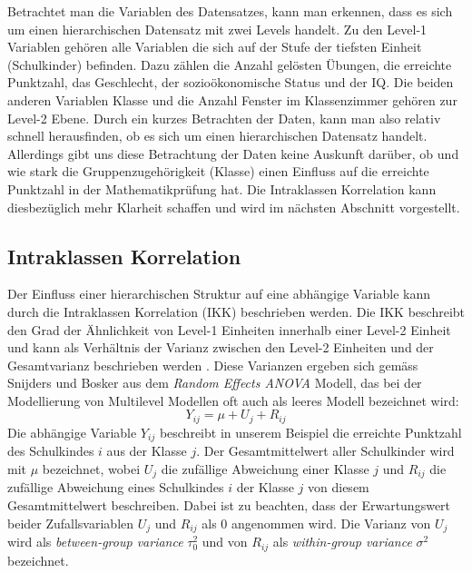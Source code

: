 \documentclass[12pt]{article}\usepackage[]{graphicx}\usepackage[]{color}
\begin{document}
Betrachtet man die Variablen des Datensatzes, kann man erkennen, dass es sich um einen hierarchischen Datensatz mit zwei Levels handelt. Zu den Level-1 Variablen gehören alle Variablen die sich auf der Stufe der tiefsten Einheit (Schulkinder) befinden. Dazu zählen die Anzahl gelösten Übungen, die erreichte Punktzahl, das Geschlecht, der sozioökonomische Status und der IQ. Die beiden anderen Variablen Klasse und die Anzahl Fenster im Klassenzimmer gehören zur Level-2 Ebene. Durch ein kurzes Betrachten der Daten, kann man also relativ schnell herausfinden, ob es sich um einen hierarchischen Datensatz handelt. Allerdings gibt uns diese Betrachtung der Daten keine Auskunft darüber, ob und wie stark die Gruppenzugehörigkeit (Klasse) einen Einfluss auf die erreichte Punktzahl in der Mathematikprüfung hat. Die Intraklassen Korrelation kann diesbezüglich mehr Klarheit schaffen und wird im nächsten Abschnitt vorgestellt.


\subsection{Intraklassen Korrelation} \label{section:icc}
Der Einfluss einer hierarchischen Struktur auf eine abhängige Variable kann durch die Intraklassen Korrelation (IKK) beschrieben werden. Die IKK beschreibt den Grad der Ähnlichkeit von Level-1 Einheiten innerhalb einer Level-2 Einheit und kann als Verhältnis der Varianz zwischen den Level-2 Einheiten und der Gesamtvarianz beschrieben werden \citep{FieldAndy2013DsuR, SnijdersTomA.B2012Ma:a, twisk_2006}. Diese Varianzen ergeben sich gemäss Snijders und Bosker \citeyearpar{SnijdersTomA.B2012Ma:a} aus dem \textit{Random Effects ANOVA} Modell, das bei der Modellierung von Multilevel Modellen oft auch als leeres Modell bezeichnet wird:
\begin{equation} \label{eq:empty_model}
Y_{ij} = \mu + U_{j} + R_{ij}
\end{equation}
Die abhängige Variable $Y_{ij}$ beschreibt in unserem Beispiel die erreichte Punktzahl des Schulkindes $i$ aus der Klasse $j$. Der Gesamtmittelwert aller Schulkinder wird mit $\mu$ bezeichnet, wobei $U_{j}$ die zufällige Abweichung einer Klasse $j$ und $R_{ij}$ die zufällige Abweichung eines Schulkindes $i$ der Klasse $j$ von diesem Gesamtmittelwert beschreiben. Dabei ist zu beachten, dass der Erwartungswert beider Zufallsvariablen $U_{j}$ und $R_{ij}$ als 0 angenommen wird. Die Varianz von $U_{j}$ wird als \textit{between-group variance} $\tau_{0}^2$ und von $R_{ij}$ als \textit{within-group variance} $\sigma^2$ bezeichnet.
\end{document}
